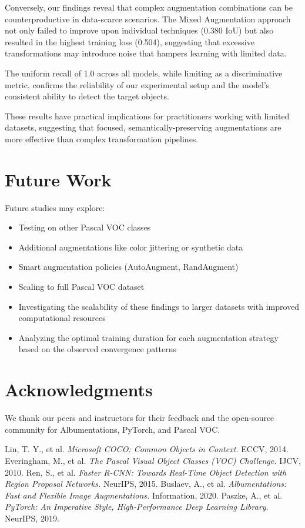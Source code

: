 \documentclass[12pt]{article}
\begin{document}
Conversely, our findings reveal that complex augmentation combinations can be counterproductive in data-scarce scenarios. The Mixed Augmentation approach not only failed to improve upon individual techniques (0.380 IoU) but also resulted in the highest training loss (0.504), suggesting that excessive transformations may introduce noise that hampers learning with limited data.

The uniform recall of 1.0 across all models, while limiting as a discriminative metric, confirms the reliability of our experimental setup and the model's consistent ability to detect the target objects.

These results have practical implications for practitioners working with limited datasets, suggesting that focused, semantically-preserving augmentations are more effective than complex transformation pipelines.

\section{Future Work}
Future studies may explore:
\begin{itemize}
\item Testing on other Pascal VOC classes
\item Additional augmentations like color jittering or synthetic data
\item Smart augmentation policies (AutoAugment, RandAugment)
\item Scaling to full Pascal VOC dataset
\item Investigating the scalability of these findings to larger datasets with improved computational resources
\item Analyzing the optimal training duration for each augmentation strategy based on the observed convergence patterns
\end{itemize}

\section*{Acknowledgments}
We thank our peers and instructors for their feedback and the open-source community for Albumentations, PyTorch, and Pascal VOC.

\begin{thebibliography}{9}
 Lin, T. Y., et al. \textit{Microsoft COCO: Common Objects in Context.} ECCV, 2014.
 Everingham, M., et al. \textit{The Pascal Visual Object Classes (VOC) Challenge.} IJCV, 2010.
 Ren, S., et al. \textit{Faster R-CNN: Towards Real-Time Object Detection with Region Proposal Networks.} NeurIPS, 2015.
 Buslaev, A., et al. \textit{Albumentations: Fast and Flexible Image Augmentations.} Information, 2020.
 Paszke, A., et al. \textit{PyTorch: An Imperative Style, High-Performance Deep Learning Library.} NeurIPS, 2019.
\end{thebibliography}
\end{document}
